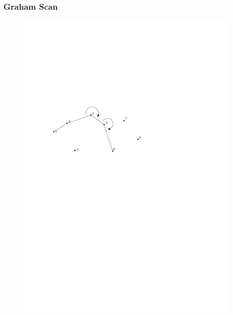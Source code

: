 \begin{frame}
	\frametitle{{Graham Scan}}
\begin{figure}[htbp]
	\begin{center}
  	\includegraphics[width=.8\linewidth]{bilder/graham5}
	\end{center}
\end{figure}
\end{frame}


